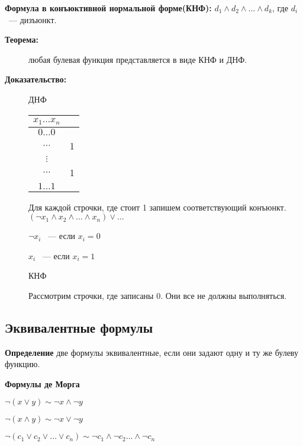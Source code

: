\documentclass[12pt]{article}
\begin{document}
{\bf Формула в конъюктивной нормальной форме(КНФ):} $d_1 \wedge d_2 \wedge \ldots \wedge d_k$, где $d_i$ ~--- дизъюнкт.

\begin{description}
\item [\bf Теорема:] любая булевая функция представляется в виде КНФ и ДНФ.
\item [\bf Доказательство:] 

ДНФ

\begin{tabular}{c|c}
$x_1 \ldots x_n$ & \\
\hline
$0 \ldots 0$ & \\
\hline
$ \ldots $ & 1 \\
\hline
$ \vdots $ &  \\
\hline
$ \ldots $ & 1 \\
\hline
$ 1 \ldots 1$ &  \\
\end{tabular}

Для каждой строчки, где стоит 1 запишем соответствующий конъюнкт. $(\neg x_1 \wedge x_2 \wedge \ldots \wedge x_n) \vee \ldots$

$\neg x_i$ ~--- если $x_i = 0$

$x_i$ ~--- если $x_i = 1$

КНФ

Рассмотрим строчки, где записаны 0. Они все не должны выполняться. 

\end{description}

\subsection{Эквивалентные формулы}

\begin{description}
\item {\bf Определение} две формулы эквивалентные, если они задают одну и ту же булеву функцию.
\end{description}


\begin{description}
\item {\bf Формулы де Морга} 

$\neg (x \vee y) \sim \neg x \wedge \neg y$

$\neg (x \wedge y) \sim \neg x \vee \neg y$
\end{description}

$\neg(c_1 \vee c_2 \vee \ldots \vee c_n) \sim \neg c_1 \wedge \neg c_2 \ldots \wedge \neg c_n$
\end{document}
